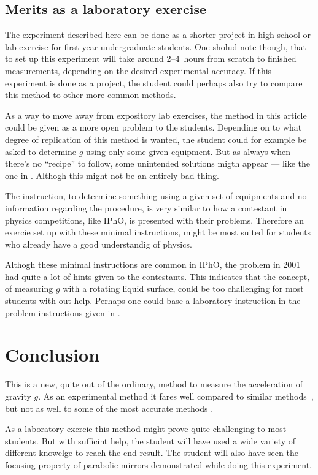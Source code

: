 \documentclass[11pt,towcolumn, swedish, english]{article}
\begin{document}
\subsection{Merits as a laboratory exercise}
The experiment described here can be done as a shorter project in high
school or lab exercise for first year undergraduate students. One
sholud note though, that to set up this experiment will take around
2--4~hours from scratch to finished measurements, depending on the
desired experimental accuracy. If this experiment is done as a
project, the student could perhaps also try to compare this method to
other more common methods.

As a way to move away from expository lab exercises, the method in
this article could be given as a more open problem to the
students. Depending on to what degree of replication of this method
is wanted, the student could for example be asked to determine $g$
using only some given equipment. But as always when there's no
``recipe'' to follow, some unintended solutions migth appear --- like
the one in \cite{IPhO2001}. Althogh this might not be an entirely bad
thing. 

The instruction, to determine something using a given set of
equipments and no information regarding the procedure, is very similar
to how a contestant in physics competitions, like IPhO, is presented
with their problems. Therefore an exercie set up with these minimal
instructions, might be most suited for students who already have a
good understandig of physics. 

Althogh these minimal instructions are common in IPhO, the problem in
2001~\cite{IPhO2001} had quite a lot of hints given to the
contestants. This indicates that the concept, of measuring $g$ with a
rotating liquid surface, could be too challenging for most students
with out help. Perhaps one could base a laboratory instruction in the
problem instructions given in \cite{IPhO2001}. 



\section{Conclusion}
This is a new, quite out of the ordinary, method to measure the
acceleration of gravity $g$. As an experimental method it fares well
compared to similar methods~\cite{IPhO2001}, but not as well to some
of the most accurate methods \cite{Candela2001}. 

As a laboratory exercie this method might prove quite challenging to
most students. But with sufficint help, the student will have used a
wide variety of different knowelge to reach the end result. The
student will also have seen the focusing property of parabolic mirrors
demonstrated while doing this experiment.
\end{document}
